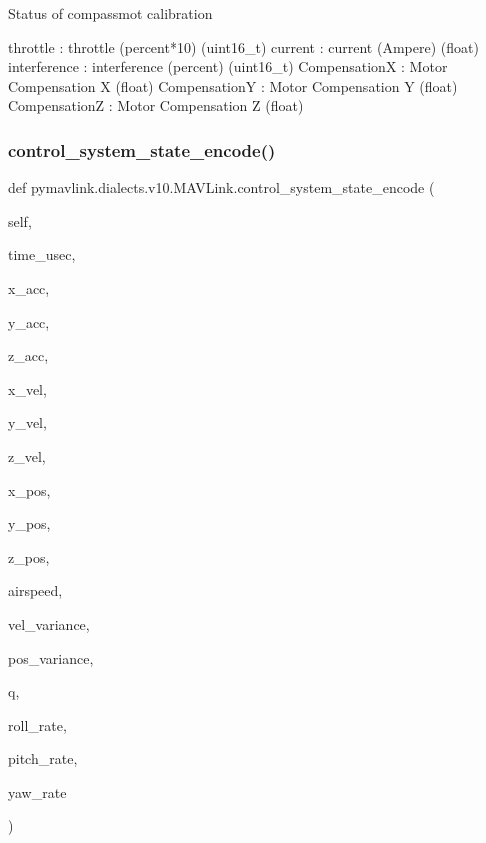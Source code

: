 \begin{DoxyVerb}
\begin{DoxyVerb}
\begin{DoxyVerb}Status of compassmot calibration

throttle                  : throttle (percent*10) (uint16_t)
current                   : current (Ampere) (float)
interference              : interference (percent) (uint16_t)
CompensationX             : Motor Compensation X (float)
CompensationY             : Motor Compensation Y (float)
CompensationZ             : Motor Compensation Z (float)\end{DoxyVerb}
 \mbox{\label{classpymavlink_1_1dialects_1_1v10_1_1MAVLink_a6e357639b448f6318b92c15f5714ec38}} 
\subsubsection{\texorpdfstring{control\+\_\+system\+\_\+state\+\_\+encode()}{control\_system\_state\_encode()}}
{\footnotesize\ttfamily def pymavlink.\+dialects.\+v10.\+M\+A\+V\+Link.\+control\+\_\+system\+\_\+state\+\_\+encode (\begin{DoxyParamCaption}\item[{}]{self,  }\item[{}]{time\+\_\+usec,  }\item[{}]{x\+\_\+acc,  }\item[{}]{y\+\_\+acc,  }\item[{}]{z\+\_\+acc,  }\item[{}]{x\+\_\+vel,  }\item[{}]{y\+\_\+vel,  }\item[{}]{z\+\_\+vel,  }\item[{}]{x\+\_\+pos,  }\item[{}]{y\+\_\+pos,  }\item[{}]{z\+\_\+pos,  }\item[{}]{airspeed,  }\item[{}]{vel\+\_\+variance,  }\item[{}]{pos\+\_\+variance,  }\item[{}]{q,  }\item[{}]{roll\+\_\+rate,  }\item[{}]{pitch\+\_\+rate,  }\item[{}]{yaw\+\_\+rate }\end{DoxyParamCaption})}


\end{DoxyVerb}
\end{DoxyVerb}
